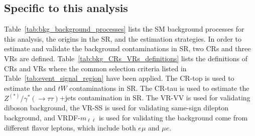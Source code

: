 
\subsection{Specific to this analysis}
\label{subsec:bkg_SRs_CRs_VRs_spicific}
Table~\ref{tab:bkg_background_processes} lists the SM background processes for this analysis, the origins in the SR, and the estimation strategies.
In order to estimate and validate the background contaminations in SR, two CRs and three VRs are defined.
Table~\ref{tab:bkg_CRs_VRs_definitions} lists the definitions of CRs and VRs where the common selection criteria listed in Table~\ref{tab:event_signal_region} have been applied.
The CR-top is used to estimate the \ttbar and $tW$ contaminations in SR.
The CR-tau is used to estimate the  $Z^{(*)}/\gamma^{*}(\to \tau \tau)$+jets contamination in SR.
The VR-VV is used for validating diboson background, the VR-SS is used for validating same-sign dilepton background, and VRDF-$m_{\ell \ell}$ is used for validating the background come from different flavor leptons, which include both $e \mu$ and $\mu e$.

\begin{table}[htbp]
    \caption{The background processes for the 2$\ell$ analysis and the strategy for estimating the background contamination in the SR.}
    \label{tab:bkg_background_processes}
\end{table}

